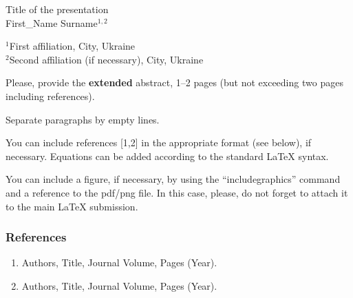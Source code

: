 \documentclass[12pt]{article}
\begin{document}
\begin{center}
    {\Large Title of the presentation}\\
    \vspace{0.2in}
    First\_Name Surname$^{1,2}$ \vspace{0.2in}
    
    
    $^{1}$First affiliation, City, Ukraine\\
    $^{2}$Second affiliation (if necessary), City, Ukraine
\end{center}

Please, provide the {\bf extended} abstract, 1--2 pages (but not exceeding two pages including references).

Separate paragraphs by empty lines.

You can include references [1,2] in the appropriate format (see below), if necessary. Equations can be added according to the standard LaTeX syntax.

You can include a figure, if necessary, by using the ``includegraphics'' command and a reference to the pdf/png file.
%
%
In this case, please, do not forget to attach it to the main LaTeX submission.

{\scriptsize
\subsubsection*{\small References}
\begin{enumerate}
    \item Authors, Title, Journal Volume, Pages (Year).
    \item Authors, Title, Journal Volume, Pages (Year).
\end{enumerate}
}
\end{document}
